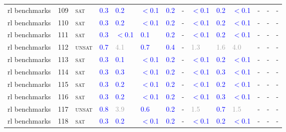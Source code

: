 \begin{center}
{\begin{longtable}{@{}llllllllllllll@{}}
rl benchmarks & 109 & \textsc{sat} & \textcolor{blue}{0.3} & \textcolor{blue}{0.2} & \textcolor{blue}{$<$0.1} & \textcolor{blue}{0.2} & - & \textcolor{blue}{$<$0.1} & \textcolor{blue}{0.2} & \textcolor{blue}{$<$0.1} & - & - & - \\
rl benchmarks & 110 & \textsc{sat} & \textcolor{blue}{0.3} & \textcolor{blue}{0.2} & \textcolor{blue}{$<$0.1} & \textcolor{blue}{0.2} & - & \textcolor{blue}{$<$0.1} & \textcolor{blue}{0.2} & \textcolor{blue}{$<$0.1} & - & - & - \\
rl benchmarks & 111 & \textsc{sat} & \textcolor{blue}{0.3} & \textcolor{blue}{$<$0.1} & \textcolor{blue}{0.1} & \textcolor{blue}{0.2} & - & \textcolor{blue}{$<$0.1} & \textcolor{blue}{0.2} & \textcolor{blue}{$<$0.1} & - & - & - \\
rl benchmarks & 112 & \textsc{unsat} & \textcolor{blue}{0.7} & \textcolor{darkgray}{4.1} & \textcolor{blue}{0.7} & \textcolor{blue}{0.4} & - & \textcolor{darkgray}{1.3} & \textcolor{darkgray}{1.6} & \textcolor{darkgray}{4.0} & - & - & - \\
rl benchmarks & 113 & \textsc{sat} & \textcolor{blue}{0.3} & \textcolor{blue}{0.1} & \textcolor{blue}{$<$0.1} & \textcolor{blue}{0.2} & - & \textcolor{blue}{$<$0.1} & \textcolor{blue}{0.2} & \textcolor{blue}{$<$0.1} & - & - & - \\
rl benchmarks & 114 & \textsc{sat} & \textcolor{blue}{0.3} & \textcolor{blue}{0.3} & \textcolor{blue}{$<$0.1} & \textcolor{blue}{0.2} & - & \textcolor{blue}{$<$0.1} & \textcolor{blue}{0.3} & \textcolor{blue}{$<$0.1} & - & - & - \\
rl benchmarks & 115 & \textsc{sat} & \textcolor{blue}{0.3} & \textcolor{blue}{0.2} & \textcolor{blue}{$<$0.1} & \textcolor{blue}{0.2} & - & \textcolor{blue}{$<$0.1} & \textcolor{blue}{0.2} & \textcolor{blue}{$<$0.1} & - & - & - \\
rl benchmarks & 116 & \textsc{sat} & \textcolor{blue}{0.3} & \textcolor{blue}{0.2} & \textcolor{blue}{$<$0.1} & \textcolor{blue}{0.2} & - & \textcolor{blue}{$<$0.1} & \textcolor{blue}{0.3} & \textcolor{blue}{$<$0.1} & - & - & - \\
rl benchmarks & 117 & \textsc{unsat} & \textcolor{blue}{0.8} & \textcolor{darkgray}{3.9} & \textcolor{blue}{0.6} & \textcolor{blue}{0.2} & - & \textcolor{darkgray}{1.5} & \textcolor{blue}{0.7} & \textcolor{darkgray}{1.5} & - & - & - \\
rl benchmarks & 118 & \textsc{sat} & \textcolor{blue}{0.3} & \textcolor{blue}{0.2} & \textcolor{blue}{$<$0.1} & \textcolor{blue}{0.2} & - & \textcolor{blue}{$<$0.1} & \textcolor{blue}{0.2} & \textcolor{blue}{$<$0.1} & - & - & - \\

\end{longtable}}
\end{center}
